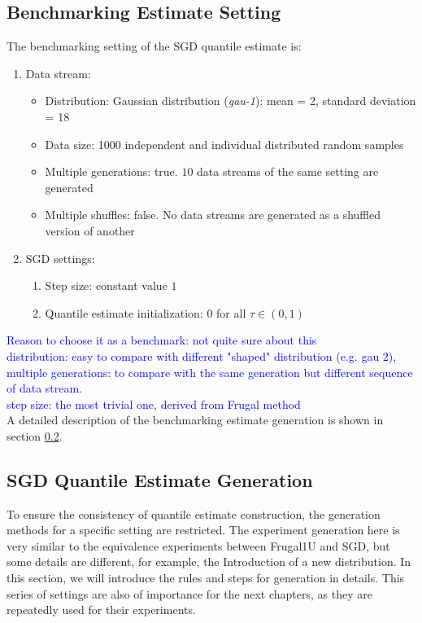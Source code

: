 \subsection{Benchmarking Estimate Setting}
The benchmarking setting of the SGD quantile estimate is:
    \begin{enumerate}
        \item Data stream:
            \begin{itemize}
                \item Distribution: Gaussian distribution (\textit{gau-1}): mean = 2, standard deviation = 18
                \item Data size: 1000 independent and individual distributed random samples
                \item Multiple generations: true. $10$ data streams of the same setting are generated
                \item Multiple shuffles: false. No data streams are generated as a shuffled version of another
            \end{itemize}
        \item SGD settings:
        \begin{enumerate}
            \item Step size: constant value $1$
            \item Quantile estimate initialization: $0$ for all $\tau \in (0,1)$
        \end{enumerate}
            
    \end{enumerate}
\textcolor{blue}{
Reason to choose it as a benchmark: not quite sure about this
\\    
distribution: easy to compare with different "shaped" distribution (e.g. gau 2), 
\\
multiple generations: to compare with the same generation but different sequence of data stream. 
\\
step size: the most trivial one, derived from Frugal method}
\\
A detailed description of the benchmarking estimate generation is shown in section \ref{subsec: exp_generation}.

\subsection{SGD Quantile Estimate Generation}
\label{subsec: exp_generation}

To ensure the consistency of quantile estimate construction, the generation methods for a specific setting are restricted.
The experiment generation here is very similar to the equivalence experiments between Frugal1U and SGD, but some details are different, for example, the Introduction of a new distribution. 
In this section, we will introduce the rules and steps for generation in details.
This series of settings are also of importance for the next chapters, as they are repeatedly used for their experiments.

